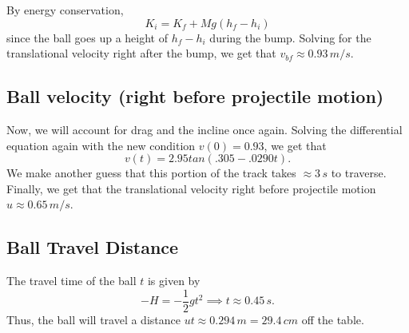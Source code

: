 \documentclass[12pt]{article} %
\begin{document}
By energy conservation,
$$K_i = K_f + Mg(h_f - h_i)$$
since the ball goes up a height of $h_f - h_i$ during the bump.
Solving for the translational velocity right after the bump, we get that $v_{bf} \approx 0.93\,m/s$.

\subsection{Ball velocity (right before projectile motion)}

Now, we will account for drag and the incline once again.
Solving the differential equation again with the new condition $v(0) = 0.93$, we get that $$v(t) = 2.95tan(.305 - .0290t).$$
We make another guess that this portion of the track takes $\approx 3\, s$ to traverse. Finally, we get that the translational velocity right before projectile motion $u \approx 0.65\, m/s$.

\subsection{Ball Travel Distance}

The travel time of the ball $t$ is given by
$$-H = -\frac{1}{2}gt^2 \implies t \approx 0.45\,s.$$
Thus, the ball will travel a distance $ut \approx 0.294\,m = 29.4\,cm$ off the table.
\end{document}
